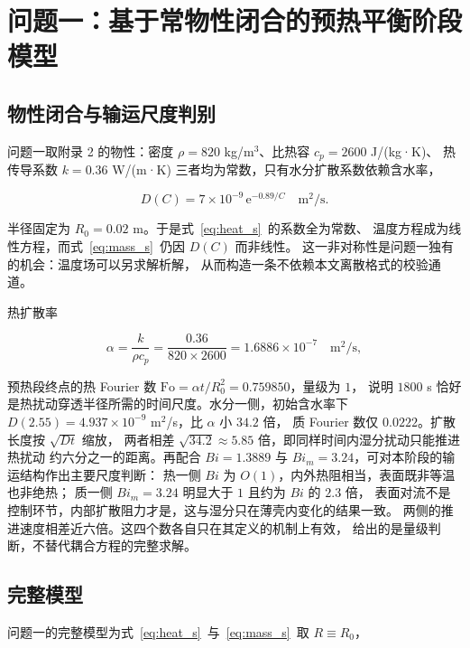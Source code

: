 \section{问题一：基于常物性闭合的预热平衡阶段模型}
\label{sec:p1}

\subsection{物性闭合与输运尺度判别}

问题一取附录 2 的物性：密度 $\rho=820$ kg/m$^3$、比热容 $c_p=2600$ J/(kg·K)、
热传导系数 $k=0.36$ W/(m·K) 三者均为常数，只有水分扩散系数依赖含水率，

\begin{equation}
D(C)=7\times10^{-9}\,\mathrm{e}^{-0.89/C}\quad\text{m}^2/\text{s}.
\label{eq:D_app2}
\end{equation}

半径固定为 $R_0=0.02$ m。于是式~\eqref{eq:heat_s}~的系数全为常数、
温度方程成为线性方程，而式~\eqref{eq:mass_s}~仍因 $D(C)$ 而非线性。
这一非对称性是问题一独有的机会：温度场可以另求解析解，
从而构造一条不依赖本文离散格式的校验通道。

热扩散率

\begin{equation}
\alpha=\frac{k}{\rho c_p}=\frac{0.36}{820\times2600}
=1.6886\times10^{-7}\quad\text{m}^2/\text{s},
\label{eq:alpha}
\end{equation}

预热段终点的热 Fourier 数 $\mathrm{Fo}=\alpha t/R_0^2=0.759850$，量级为 $1$，
说明 $1800$ s 恰好是热扰动穿透半径所需的时间尺度。水分一侧，初始含水率下
$D(2.55)=4.937\times10^{-9}$ m$^2$/s，比 $\alpha$ 小 $34.2$ 倍，
质 Fourier 数仅 $0.0222$。扩散长度按 $\sqrt{Dt}$ 缩放，
两者相差 $\sqrt{34.2}\approx5.85$ 倍，即同样时间内湿分扰动只能推进热扰动
约六分之一的距离。再配合 $Bi=1.3889$ 与 $Bi_m=3.24$，可对本阶段的输运结构作出主要尺度判断：
热一侧 $Bi$ 为 $O(1)$，内外热阻相当，表面既非等温也非绝热；
质一侧 $Bi_m=3.24$ 明显大于 $1$ 且约为 $Bi$ 的 $2.3$ 倍，
表面对流不是控制环节，内部扩散阻力才是，这与湿分只在薄壳内变化的结果一致。
两侧的推进速度相差近六倍。这四个数各自只在其定义的机制上有效，
给出的是量级判断，不替代耦合方程的完整求解。

\subsection{完整模型}

问题一的完整模型为式~\eqref{eq:heat_s}~与~\eqref{eq:mass_s}~取 $R\equiv R_0$，

